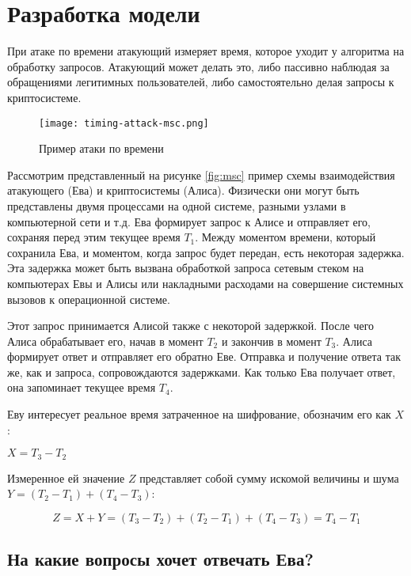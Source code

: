 \section{Разработка модели} \label{sec:timing}

При атаке по времени атакующий измеряет время, которое уходит у алгоритма на
обработку запросов. Атакующий может делать это, либо пассивно наблюдая за
обращениями легитимных пользователей, либо самостоятельно делая запросы к
криптосистеме.

\begin{figure}[h]
    \centering
    \texttt{[image: timing-attack-msc.png]}
    \caption{Пример атаки по времени}
\end{figure} \label{fig:msc}

Рассмотрим представленный на рисунке \ref{fig:msc} пример схемы взаимодействия
атакующего (Ева) и криптосистемы (Алиса). Физически они могут быть представлены
двумя процессами на одной системе, разными узлами в компьютерной сети и т.д.
Ева формирует запрос к Алисе и отправляет его, сохраняя перед этим текущее
время $T_1$. Между моментом времени, который сохранила Ева, и моментом, когда
запрос будет передан, есть некоторая задержка. Эта задержка может быть вызвана
обработкой запроса сетевым стеком на компьютерах Евы и Алисы или накладными
расходами на совершение системных вызовов к операционной системе.

Этот запрос принимается Алисой также с некоторой задержкой. После чего Алиса
обрабатывает его, начав в момент $T_2$ и закончив в момент $T_3$. Алиса
формирует ответ и отправляет его обратно Еве. Отправка и получение ответа так
же, как и запроса, сопровождаются задержками. Как только Ева получает ответ, она
запоминает текущее время $T_4$.

Еву интересует реальное время затраченное на шифрование, обозначим его как $X$ :

$X = T_3 - T_2$

Измеренное ей значение $Z$ представляет собой сумму искомой величины и шума
$Y = (T_2 - T_1) + (T_4 - T_3)$:

\begin{equation}
Z = X + Y = (T_3 - T_2) + (T_2 - T_1) + (T_4 - T_3) = T_4 - T_1
\end{equation} \label{eq:noise}

\subsection{На какие вопросы хочет отвечать Ева?}

